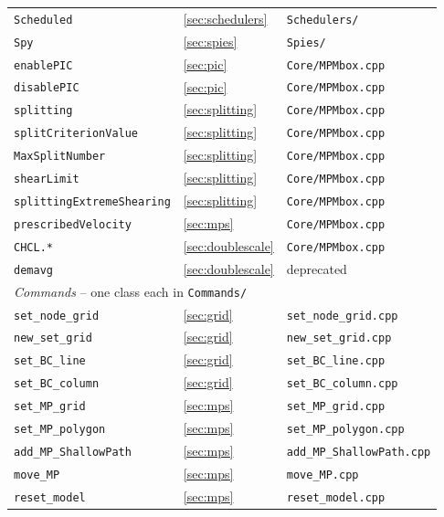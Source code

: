 \documentclass[a4paper,onecolumn,11pt]{doofus}
\begin{document}
\begin{center}
\begin{longtable}{lll}
\texttt{Scheduled}        & \ref{sec:schedulers}  & \texttt{Schedulers/} \\
\texttt{Spy}              & \ref{sec:spies}       & \texttt{Spies/} \\
\texttt{enablePIC}        & \ref{sec:pic}         & \texttt{Core/MPMbox.cpp} \\
\texttt{disablePIC}       & \ref{sec:pic}         & \texttt{Core/MPMbox.cpp} \\
\texttt{splitting}        & \ref{sec:splitting}   & \texttt{Core/MPMbox.cpp} \\
\texttt{splitCriterionValue} & \ref{sec:splitting} & \texttt{Core/MPMbox.cpp} \\
\texttt{MaxSplitNumber}   & \ref{sec:splitting}   & \texttt{Core/MPMbox.cpp} \\
\texttt{shearLimit}       & \ref{sec:splitting}   & \texttt{Core/MPMbox.cpp} \\
\texttt{splittingExtremeShearing} & \ref{sec:splitting} & \texttt{Core/MPMbox.cpp} \\
\texttt{prescribedVelocity} & \ref{sec:mps}       & \texttt{Core/MPMbox.cpp} \\
\texttt{CHCL.*}           & \ref{sec:doublescale} & \texttt{Core/MPMbox.cpp} \\
\texttt{demavg}           & \ref{sec:doublescale} & deprecated \\
\midrule
\multicolumn{3}{l}{\emph{Commands} -- one class each in \texttt{Commands/}}\\
\midrule
\texttt{set\_node\_grid}       & \ref{sec:grid} & \texttt{set\_node\_grid.cpp} \\
\texttt{new\_set\_grid}        & \ref{sec:grid} & \texttt{new\_set\_grid.cpp} \\
\texttt{set\_BC\_line}         & \ref{sec:grid} & \texttt{set\_BC\_line.cpp} \\
\texttt{set\_BC\_column}       & \ref{sec:grid} & \texttt{set\_BC\_column.cpp} \\
\texttt{set\_MP\_grid}         & \ref{sec:mps}  & \texttt{set\_MP\_grid.cpp} \\
\texttt{set\_MP\_polygon}      & \ref{sec:mps}  & \texttt{set\_MP\_polygon.cpp} \\
\texttt{add\_MP\_ShallowPath}  & \ref{sec:mps}  & \texttt{add\_MP\_ShallowPath.cpp} \\
\texttt{move\_MP}              & \ref{sec:mps}  & \texttt{move\_MP.cpp} \\
\texttt{reset\_model}          & \ref{sec:mps}  & \texttt{reset\_model.cpp} \\

\end{longtable}
\end{center}
\end{document}
